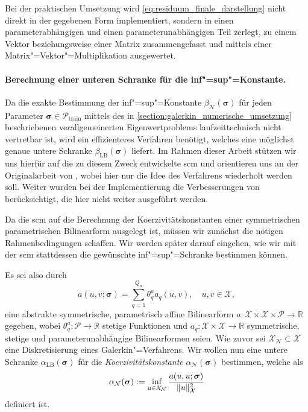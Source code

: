 \documentclass[../main.tex]{subfiles}
\begin{document}
Bei der praktischen Umsetzung wird \cref{eq:residuum_finale_darstellung} nicht direkt in der gegebenen Form implementiert, sondern in einen parameterabhängigen und einen parameterunabhängigen Teil zerlegt, zu einem Vektor beziehungsweise einer Matrix zusammengefasst und mittels einer Matrix"=Vektor"=Multiplikation ausgewertet.


\paragraph{Berechnung einer unteren Schranke für die inf"=sup"=Konstante.} %
\label{par:berechnung_der_unteren_schranke_f_r_die_inf_sup_konstante_}

Da die exakte Bestimmung der inf"=sup"=Konstante $\beta_{\mathcal N}(\bm \sigma)$ für jeden Parameter $\bm \sigma \in \mathcal P_{\mathrm{train}}$ mittels des in \cref{section:galerkin_numerische_umsetzung} beschriebenen verallgemeinerten Eigenwertproblems laufzeittechnisch nicht vertretbar ist, wird ein effizienteres Verfahren benötigt, welches eine möglichst genaue untere Schranke $\beta_{\mathrm{LB}}(\bm \sigma)$ liefert.
Im Rahmen dieser Arbeit stützen wir uns hierfür auf die zu diesem Zweck entwickelte \ac{scm} und orientieren uns an der Originalarbeit von \textcite{Huynh2007}, wobei hier nur die Idee des Verfahrens wiederholt werden soll.
Weiter wurden bei der Implementierung die Verbesserungen von \textcite{Chen2009} berücksichtigt, die hier nicht weiter ausgeführt werden.

Da die \ac{scm} auf die Berechnung der Koerzivitätskonstanten einer symmetrischen parametrischen Bilinearform ausgelegt ist, müssen wir zunächst die nötigen Rahmenbedingungen schaffen.
Wir werden später darauf eingehen, wie wir mit der \ac{scm} stattdessen die gewünschte inf"=sup"=Schranke bestimmen können.

Es sei also durch
\begin{equation}
    a(u, v; \bm \sigma) = \sum_{q = 1}^{Q_a} \theta_{q}^{a} a_{q}(u, v), \quad u,v \in \mathcal X,
\end{equation}
eine abstrakte symmetrische, parametrisch affine Bilinearform $a \colon \mathcal X \times \mathcal X \times \mathcal P \to \mathbb{R}$ gegeben, wobei $\theta_{q}^{a} \colon \mathcal P \to \mathbb{R}$ stetige Funktionen und $a_{q} \colon \mathcal X \times \mathcal X \to \mathbb{R}$ symmetrische, stetige und parameterunabhängige Bilinearformen seien.
Wie zuvor sei $\mathcal X_{\mathcal N} \subset \mathcal X$ eine Diskretisierung eines Galerkin"=Verfahrens.
Wir wollen nun eine untere Schranke $\alpha_{\mathrm{LB}}(\bm \sigma)$ für die \emph{Koerzivitätskonstante} $\alpha_{\mathcal N}(\bm \sigma)$ bestimmen, welche als
\begin{equation}
    \alpha_{\mathcal N}(\bm \sigma) := \inf_{u \in \mathcal X_{\mathcal N}} \frac{a(u, u; \bm \sigma)}{\lVert u\rVert_{\mathcal X}^{2}}
\end{equation}
definiert ist.
\end{document}
